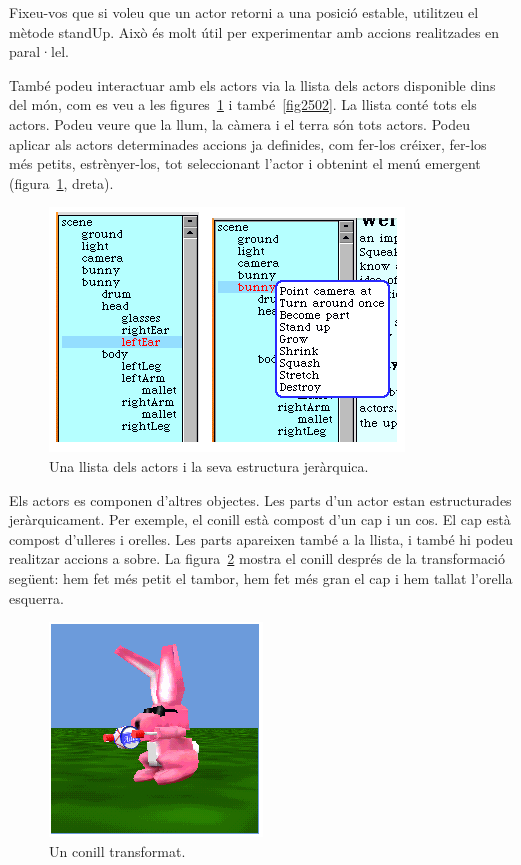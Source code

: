 Fixeu-vos que si voleu que un actor retorni a una posició estable, utilitzeu el mètode \textsf{standUp}. Això és molt útil per experimentar amb accions realitzades en paral·lel.

També podeu interactuar amb els actors via la llista dels actors disponible dins del món, com es veu a les figures~\ref{fig2504} i també~\ref{fig2502}. La llista conté tots els actors. Podeu veure que la llum, la càmera i el terra són tots actors. Podeu aplicar als actors determinades accions ja definides, com fer-los créixer, fer-los més petits, estrènyer-los, tot seleccionant l'actor i obtenint el menú emergent (figura~\ref{fig2504}, dreta).
\begin{figure}[h!]
\begin{center}
\includegraphics[scale=2.5]{Imatges/figura25-4}
\end{center}
\caption{Una llista dels actors i la seva estructura jeràrquica.}
\label{fig2504}
\end{figure}

Els actors es componen d'altres objectes. Les parts d'un actor estan estructurades jeràrquicament. Per exemple, el conill està compost d'un cap i un cos. El cap està compost d'ulleres i orelles. Les parts apareixen també a la llista, i també hi podeu realitzar accions a sobre. La figura~\ref{fig2505} mostra el conill després de la transformació següent: hem fet més petit el tambor, hem fet més gran el cap i hem tallat l'orella esquerra.
\begin{figure}[h!]
\begin{center}
\includegraphics[scale=0.65]{Imatges/figura25-5}
\end{center}
\caption{Un conill transformat.}
\label{fig2505}
\end{figure}

